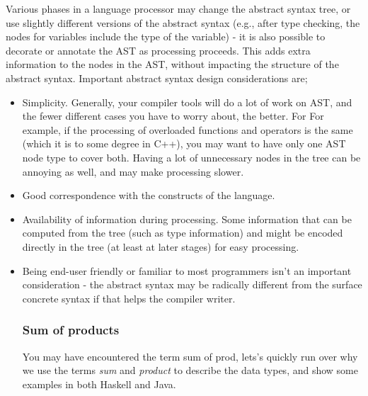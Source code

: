 \documentclass[tikz, border=5mm]{article}
\begin{document}
        Various phases in a language processor may change the abstract syntax
        tree, or use slightly different versions of the abstract syntax (e.g., after type
        checking, the nodes for variables include the type of the variable) - it is also
        possible to decorate or annotate the AST as processing proceeds. 
        This adds extra information to the nodes in the AST, without impacting the structure of the abstract syntax.
        Important abstract syntax design considerations are;
        \begin{itemize}
            \item Simplicity. Generally, your compiler tools will do a lot of work on AST,
            and the fewer different cases you have to worry about, the better. For
            For example, if the processing of overloaded functions and operators is the same (which it is to some degree in C++), you may want to have
            only one AST node type to cover both. Having a lot of unnecessary nodes
            in the tree can be annoying as well, and may make processing slower.
            \item Good correspondence with the constructs of the language.
            \item Availability of information during processing. Some information that
            can be computed from the tree (such as type information) and might be encoded directly in the tree (at least at later stages) for easy processing.
            \item Being end-user friendly or familiar to most programmers isn't an important consideration - the abstract syntax may be radically different from
            the surface concrete syntax if that helps the compiler writer.
            \subsubsection{Sum of products}
            You may have encountered the term \gls{sum of prod}, lets's quickly run over why we use the terms \textit{sum} and \textit{product} 
            to describe the data types, and show some examples in both Haskell and Java.

\end{itemize}
\end{document}
